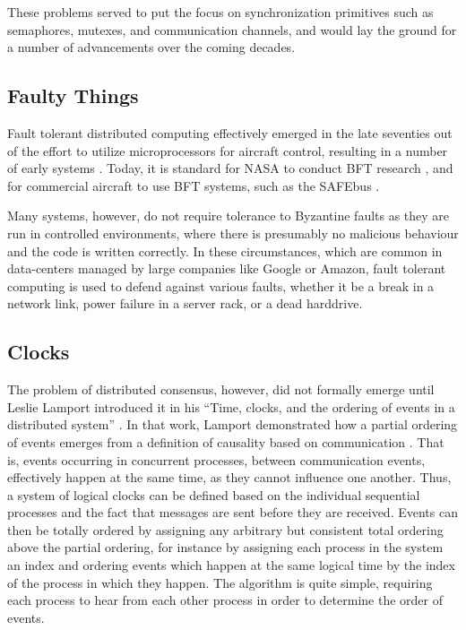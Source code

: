 These problems served to put the focus on synchronization primitives
such as semaphores, mutexes, and communication channels,
and would lay the ground for a number of advancements over the coming decades.

\subsection{Faulty Things}

Fault tolerant distributed computing effectively emerged in the late seventies 
out of the effort to utilize microprocessors for aircraft control, resulting in a number of early systems \cite{sift,ftmp}.
Today, it is standard for NASA to conduct BFT research \cite{miner2004unified}, 
and for commercial aircraft to use BFT systems, such as the SAFEbus \cite{hoyme1993safebus}.

Many systems, however, do not require tolerance to Byzantine faults as they are run in controlled environments,
where there is presumably no malicious behaviour and the code is written correctly.
In these circumstances, which are common in data-centers managed by large companies like Google or Amazon,
fault tolerant computing is used to defend against various faults,
whether it be a break in a network link, power failure in a server rack, or a dead harddrive.

\subsection{Clocks}

The problem of distributed consensus, however, did not formally emerge until Leslie Lamport introduced it in his 
``Time, clocks, and the ordering of events in a distributed system'' \cite{clocks}.
In that work, Lamport demonstrated how a partial ordering of events emerges from a definition of causality based on communication \cite{clocks}.
That is, events occurring in concurrent processes, between communication events, 
effectively happen at the same time, as they cannot influence one another.
Thus, a system of logical clocks can be defined based on the individual sequential processes 
and the fact that messages are sent before they are received.
Events can then be totally ordered by assigning any arbitrary but consistent total ordering above the partial ordering,
for instance by assigning each process in the system an index and ordering events which happen at the same logical time by the
index of the process in which they happen.
The algorithm is quite simple, requiring each process to hear from each other process in order to determine the order of events.

